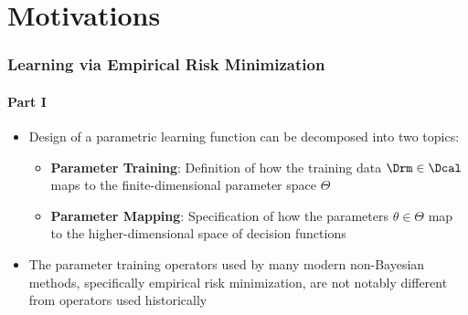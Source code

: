 \documentclass[aspectratio=169,usenames,dvipsnames]{beamer}
\begin{document}
\section{Motivations}


\begin{frame}
\frametitle{Learning via Empirical Risk Minimization}
\framesubtitle{Part I}

\begin{itemize}
\item Design of a parametric learning function can be decomposed into two topics:
	\vspace{0.25em}
	\begin{itemize}
	\item \textbf{Parameter Training}: Definition of how the training data $\Drm \in \Dcal$ maps to the finite-dimensional parameter space $\Theta$
	\vspace{0.25em}
	\item \textbf{Parameter Mapping}: Specification of how the parameters $\theta \in \Theta$ map to the higher-dimensional space of decision functions 
	\end{itemize}
\vspace{0.5em}
\item The parameter training operators used by many modern non-Bayesian methods, specifically \alert{empirical risk minimization}, are not notably different from operators used historically

\end{itemize}

\vspace{1em}
\centering
{}

\end{frame}
\end{document}
